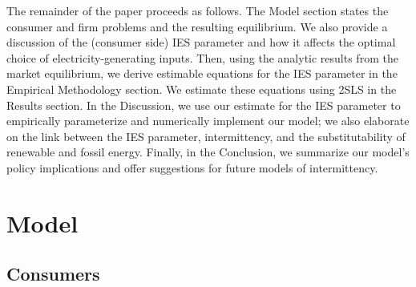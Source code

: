 \documentclass[11pt,a4paper,leqno]{extarticle}
\begin{document}
	
	The remainder of the paper proceeds as follows. The Model section states the consumer and firm problems and the resulting equilibrium. We also provide a discussion of the (consumer side) IES parameter and how it affects the optimal choice of electricity-generating inputs. Then, using the analytic results from the market equilibrium, we derive estimable equations for the IES parameter in the Empirical Methodology section. We estimate these equations using 2SLS in the Results section.  In the Discussion, we use our estimate for the IES parameter to empirically parameterize and numerically implement our model; we also elaborate on the link between the IES parameter, intermittency, and the substitutability of renewable and fossil energy. Finally, in the Conclusion, we summarize our model's policy implications and offer suggestions for future models of intermittency. 
	
	
	
	
	\section{Model}
	\label{sec:Model}
	
	\subsection{Consumers}
	\label{sec:consumers}
	
\end{document}
